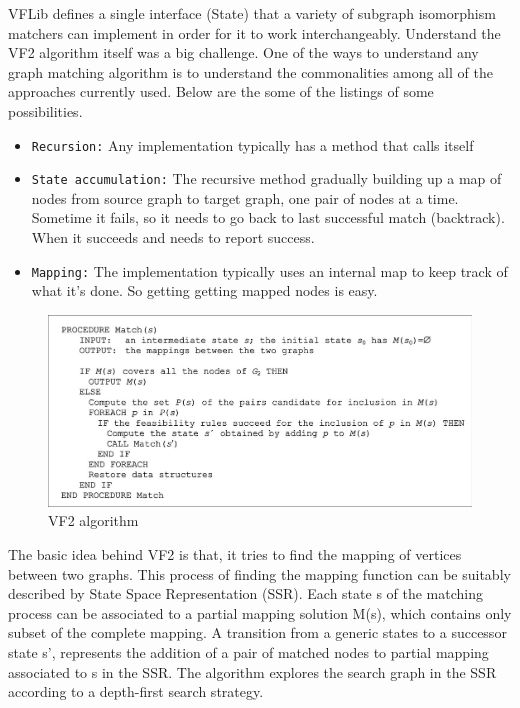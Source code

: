VFLib defines a single interface (State) that a variety of subgraph isomorphism matchers can implement in order for it to work interchangeably. Understand the VF2 algorithm itself was a big challenge. One of the ways to understand any graph matching algorithm is to understand the commonalities among all of the approaches currently used. Below are the some of the listings of some possibilities. 

\begin{itemize}
\item \texttt{Recursion:} Any implementation typically has a method that calls itself
\item\texttt{State accumulation:} The recursive method gradually building up a map of nodes from source 
graph to target graph, one pair of nodes at a time. Sometime it fails, so it needs to go back to last successful match (backtrack). When it succeeds and needs to report success.
\item \texttt{Mapping:} The implementation typically uses an internal map to keep track of what it's done. So getting getting mapped nodes is easy.
\end{itemize}
 
\begin{figure}
\centerline{
\includegraphics[width=1.0\columnwidth]{figures/vf2_image.png}
}
\caption{VF2 algorithm}
\label{vf2}
\end{figure}

The basic idea behind VF2 is that, it tries to find the mapping of vertices between two graphs. 
This process of finding the mapping function can be suitably
described by State Space Representation (SSR). 
Each state s of the matching process can be associated to a partial
mapping solution M(s), which contains only subset of the complete mapping. A transition from a generic states to a successor state s', represents the addition of a pair of matched nodes to partial mapping associated to s in the SSR. The algorithm explores the search graph in the SSR according to a depth-first search strategy. 

